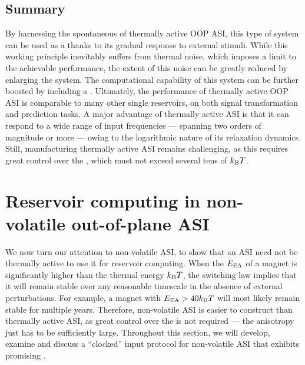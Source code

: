 \subsection{Summary}
By harnessing the spontaneous  of thermally active OOP ASI, this type of system can be used as a  thanks to its gradual response to external stimuli.
While this working principle inevitably suffers from thermal noise, which imposes a limit to the achievable performance, the extent of this noise can be greatly reduced by enlarging the system.
The computational capability of this system can be further boosted by including a .
Ultimately, the performance of thermally active OOP ASI is comparable to many other single reservoirs, on both signal transformation and prediction tasks.
A major advantage of thermally active ASI is that it can respond to a wide range of input frequencies --- spanning two orders of magnitude or more --- owing to the logarithmic nature of its relaxation dynamics.
Still, manufacturing thermally active ASI remains challenging, as this requires great control over the , which must not exceed several tens of $\kBT$.


\newpage
\section{Reservoir computing in non-volatile out-of-plane ASI}
We now turn our attention to non-volatile ASI, to show that an ASI need not be thermally active to use it for reservoir computing.
When the  $E_\mathrm{EA}$ of a magnet is significantly higher than the thermal energy $\kBT$, the  switching law implies that it will remain stable over any reasonable timescale in the absence of external perturbations.
For example, a magnet with $\EEA > 40 \kBT$ will most likely remain stable for multiple years.
Therefore, non-volatile ASI is easier to construct than thermally active ASI, as great control over the  is not required --- the anisotropy just has to be sufficiently large.
Throughout this section, we will develop, examine and discuss a ``clocked'' input protocol for non-volatile ASI that exhibits promising .

